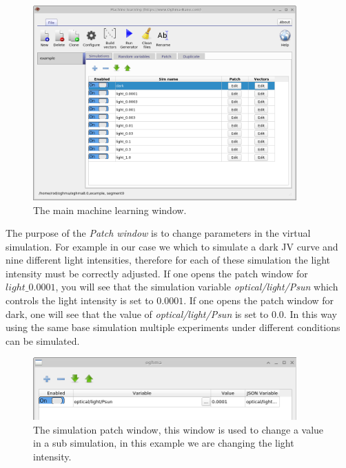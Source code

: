 \begin{figure}
\centering
\includegraphics[width=0.9\textwidth,height=0.7\textwidth]{./images/ml/simulations.png}
\caption{The main machine learning window.}
\label{fig:main_ml_window}
\end{figure}

The purpose of the \emph{Patch window} is to change parameters in the virtual simulation. For example in our case we which to simulate a dark JV curve and nine different light intensities, therefore for each of these simulation the light intensity must be correctly adjusted. If one opens the patch window for $light\_0.0001$, you will see that the simulation variable \emph{optical/light/Psun} which controls the light intensity is set to $0.0001$. If one opens the patch window for dark, one will see that the value of \emph{optical/light/Psun} is set to $0.0$. In this way using the same base simulation multiple experiments under different conditions can be simulated.

\begin{figure}
\centering
\includegraphics[width=0.9\textwidth,height=0.25\textwidth]{./images/ml/patch.png}
\caption{The simulation patch window, this window is used to change a value in a sub simulation, in this example we are changing the light intensity.}
\label{fig:ml_patch}
\end{figure}

